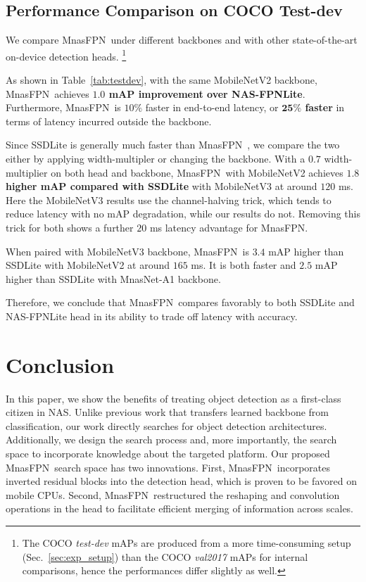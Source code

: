 \documentclass[10pt,twocolumn,letterpaper]{article}
\def\Mnasfpn{MnasFPN~}
\def\Mnasfpnnospace{MnasFPN}
\begin{document}
\subsection{Performance Comparison on COCO Test-dev}
\label{sec:generalizability}
\label{sec:testdev}

We compare \Mnasfpn under different backbones and with other state-of-the-art on-device detection heads. \footnote{The COCO {\it test-dev} mAPs are produced from a more time-consuming setup (Sec.~\ref{sec:exp_setup}) than the COCO {\it val2017} mAPs for internal comparisons, hence the performances differ slightly as well.} 













As shown in Table~\ref{tab:testdev}, with the same MobileNetV2 backbone, \Mnasfpn achieves {\bf $\mathbf{1.0}$ mAP improvement over NAS-FPNLite}. Furthermore, \Mnasfpn is $10\%$ faster in end-to-end latency, or {\bf $\mathbf{25\%}$ faster} in terms of latency incurred outside the backbone. 

Since SSDLite is generally much faster than \Mnasfpn, we compare the two either by applying width-multipler or changing the backbone. With a $0.7$ width-multiplier on both head and backbone, \Mnasfpn with MobileNetV2 achieves {\bf $\mathbf{1.8}$ higher mAP compared with SSDLite} with MobileNetV3 at around $120$ ms. Here the MobileNetV3 results use the channel-halving trick, which tends to reduce latency with no mAP degradation, while our results do not. Removing this trick for both shows a further $20$ ms latency advantage for \Mnasfpnnospace. 

When paired with MobileNetV3 backbone, \Mnasfpn is $3.4$ mAP higher than SSDLite with MobileNetV2 at around $165$ ms. It is both faster and $2.5$ mAP higher than SSDLite with MnasNet-A1 backbone. 

Therefore, we conclude that \Mnasfpn compares favorably to both SSDLite and NAS-FPNLite head in its ability to trade off latency with accuracy.





 
\section{Conclusion}
In this paper, we show the benefits of treating object detection as a first-class citizen in NAS. Unlike previous work that transfers learned backbone from classification, our work directly searches for object detection architectures. Additionally, we design the search process and, more importantly, the search space to incorporate knowledge about the targeted platform. Our proposed \Mnasfpn search space has two innovations. First, \Mnasfpn incorporates inverted residual blocks into the detection head, which is proven to be favored on mobile CPUs. Second, \Mnasfpn restructured the reshaping and convolution operations in the head to facilitate efficient merging of information across scales. 
\end{document}
